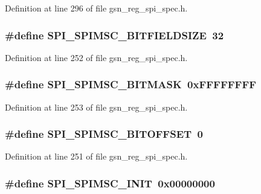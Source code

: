 Definition at line 296 of file gsn\_\-reg\_\-spi\_\-spec.h.

\hypertarget{a00573_a7620e344b82fff7dd11e3c08ef9eed9a}{
\subsubsection[{SPI\_\-SPIMSC\_\-BITFIELDSIZE}]{\setlength{\rightskip}{0pt plus 5cm}\#define SPI\_\-SPIMSC\_\-BITFIELDSIZE~32}}
\label{a00573_a7620e344b82fff7dd11e3c08ef9eed9a}


Definition at line 252 of file gsn\_\-reg\_\-spi\_\-spec.h.

\hypertarget{a00573_a5106adffe460f2f6e0ec5f85f7893454}{
\subsubsection[{SPI\_\-SPIMSC\_\-BITMASK}]{\setlength{\rightskip}{0pt plus 5cm}\#define SPI\_\-SPIMSC\_\-BITMASK~0xFFFFFFFF}}
\label{a00573_a5106adffe460f2f6e0ec5f85f7893454}


Definition at line 253 of file gsn\_\-reg\_\-spi\_\-spec.h.

\hypertarget{a00573_ad251acb591ab595a7e8ba50da83394bf}{
\subsubsection[{SPI\_\-SPIMSC\_\-BITOFFSET}]{\setlength{\rightskip}{0pt plus 5cm}\#define SPI\_\-SPIMSC\_\-BITOFFSET~0}}
\label{a00573_ad251acb591ab595a7e8ba50da83394bf}


Definition at line 251 of file gsn\_\-reg\_\-spi\_\-spec.h.

\hypertarget{a00573_af10e91d323a47ea13abc64af035691ac}{
\subsubsection[{SPI\_\-SPIMSC\_\-INIT}]{\setlength{\rightskip}{0pt plus 5cm}\#define SPI\_\-SPIMSC\_\-INIT~0x00000000}}
\label{a00573_af10e91d323a47ea13abc64af035691ac}


